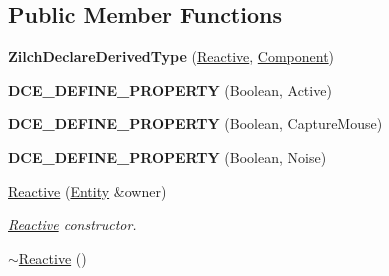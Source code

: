 \subsection*{Public Member Functions}
\begin{DoxyCompactItemize}
\item 
\hypertarget{classDCEngine_1_1Components_1_1Reactive_a132ce7aea62f63c4a50ada6ab4b9ba90}{{\bfseries Zilch\-Declare\-Derived\-Type} (\hyperlink{classDCEngine_1_1Components_1_1Reactive}{Reactive}, \hyperlink{classDCEngine_1_1Component}{Component})}\label{classDCEngine_1_1Components_1_1Reactive_a132ce7aea62f63c4a50ada6ab4b9ba90}

\item 
\hypertarget{classDCEngine_1_1Components_1_1Reactive_a46f8d7f13b430bc211bae456b2d4142c}{{\bfseries D\-C\-E\-\_\-\-D\-E\-F\-I\-N\-E\-\_\-\-P\-R\-O\-P\-E\-R\-T\-Y} (Boolean, Active)}\label{classDCEngine_1_1Components_1_1Reactive_a46f8d7f13b430bc211bae456b2d4142c}

\item 
\hypertarget{classDCEngine_1_1Components_1_1Reactive_a8c9791cd79983a48df5731108a71933d}{{\bfseries D\-C\-E\-\_\-\-D\-E\-F\-I\-N\-E\-\_\-\-P\-R\-O\-P\-E\-R\-T\-Y} (Boolean, Capture\-Mouse)}\label{classDCEngine_1_1Components_1_1Reactive_a8c9791cd79983a48df5731108a71933d}

\item 
\hypertarget{classDCEngine_1_1Components_1_1Reactive_a0be9423d1153f20e4268cf5274964bdd}{{\bfseries D\-C\-E\-\_\-\-D\-E\-F\-I\-N\-E\-\_\-\-P\-R\-O\-P\-E\-R\-T\-Y} (Boolean, Noise)}\label{classDCEngine_1_1Components_1_1Reactive_a0be9423d1153f20e4268cf5274964bdd}

\item 
\hypertarget{classDCEngine_1_1Components_1_1Reactive_ad7e78462bb0b8e14f8c13768e6090345}{\hyperlink{classDCEngine_1_1Components_1_1Reactive_ad7e78462bb0b8e14f8c13768e6090345}{Reactive} (\hyperlink{classDCEngine_1_1Entity}{Entity} \&owner)}\label{classDCEngine_1_1Components_1_1Reactive_ad7e78462bb0b8e14f8c13768e6090345}

\begin{DoxyCompactList}\small\item\em \hyperlink{classDCEngine_1_1Components_1_1Reactive}{Reactive} constructor. \end{DoxyCompactList}\item 
\hypertarget{classDCEngine_1_1Components_1_1Reactive_a534c9874463935157c63432b2bd050fb}{\hyperlink{classDCEngine_1_1Components_1_1Reactive_a534c9874463935157c63432b2bd050fb}{$\sim$\-Reactive} ()}\label{classDCEngine_1_1Components_1_1Reactive_a534c9874463935157c63432b2bd050fb}


\end{DoxyCompactItemize}
